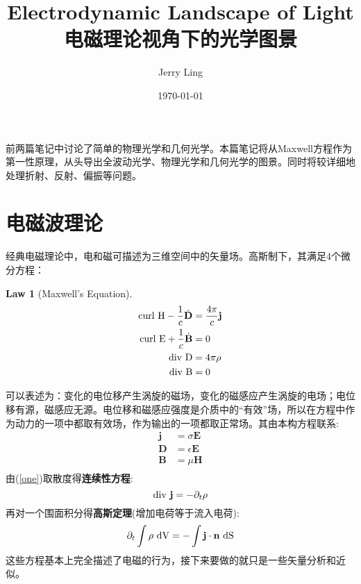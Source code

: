 \documentclass[12pt]{ctexart}%
\title{Electrodynamic Landscape of Light\\电磁理论视角下的光学图景}
\author{Jerry Ling}
\date{\today}
\newtheorem{theorem}{Law}
\begin{document}
\maketitle  %
前两篇笔记中讨论了简单的物理光学和几何光学。本篇笔记将从Maxwell方程作为第一性原理，从头导出全波动光学、物理光学和几何光学的图景。同时将较详细地处理折射、反射、偏振等问题。

\section*{电磁波理论}
经典电磁理论中，电和磁可描述为三维空间中的矢量场。高斯制下，其满足4个微分方程：

\begin{theorem}[Maxwell's Equation]\label{Maxwell}
    \begin{align}
        \textup{curl H} - \frac{1}{c}\dot{\textbf{D}}&=\frac{4\pi}{c}\textbf{j}
            \label{one} \\
            \textup{curl E} + \frac{1}{c}\dot{\textbf{B}}&= 0
            \label{two} \\
            \textup{div D}&=4\pi \rho
            \label{three} \\
            \textup{div B}&=0
            \label{four} 
    \end{align}
\end{theorem}

\noindent 可以表述为：变化的电位移产生涡旋的磁场，变化的磁感应产生涡旋的电场；电位移有源，磁感应无源。电位移和磁感应强度是介质中的“有效”场，所以在方程中作为动力的一项中都取有效场，作为输出的一项都取正常场。其由本构方程联系:
\begin{equation}
    \begin{aligned}
        \textbf{j} &= \sigma \textbf{E}\\
        \textbf{D} &= \epsilon \textbf{E}\\
        \textbf{B} &= \mu \textbf{H}\\
    \end{aligned}
    \label{material equ}
\end{equation}
由(\ref{one})取散度得\textbf{连续性方程}:
\begin{equation}
    \textup{div } \textbf{j} = - \partial_t{\rho}
\end{equation}
再对一个围面积分得\textbf{高斯定理}(增加电荷等于流入电荷):
\begin{equation}
    \partial_t \int{\rho}\textup{ dV} = -\int \textbf{j} \cdot \textbf{n} \textup{ dS} 
\end{equation}
这些方程基本上完全描述了电磁的行为，接下来要做的就只是一些矢量分析和近似。
\end{document}
